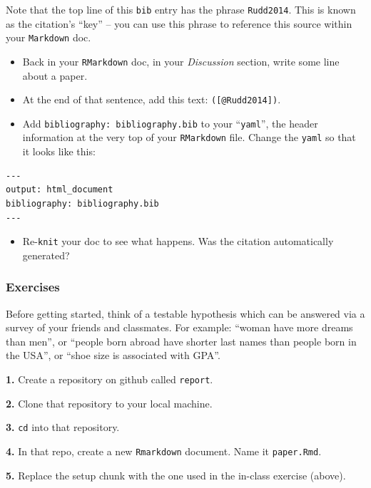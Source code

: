 \documentclass[
]{book}
\providecommand{\tightlist}{%
  \setlength{\itemsep}{0pt}\setlength{\parskip}{0pt}}
\begin{document}
Note that the top line of this \texttt{bib} entry has the phrase \texttt{Rudd2014}. This is known as the citation's ``key'' -- you can use this phrase to reference this source within your \texttt{Markdown} doc.

\begin{itemize}
\item
  Back in your \texttt{RMarkdown} doc, in your \emph{Discussion} section, write some line about a paper.
\item
  At the end of that sentence, add this text: \texttt{({[}@Rudd2014{]})}.
\item
  Add \texttt{bibliography:\ bibliography.bib} to your ``\texttt{yaml}'', the header information at the very top of your \texttt{RMarkdown} file. Change the \texttt{yaml} so that it looks like this:
\end{itemize}

\begin{verbatim}
---
output: html_document
bibliography: bibliography.bib
---
\end{verbatim}

\begin{itemize}
\tightlist
\item
  Re-\texttt{knit} your doc to see what happens. Was the citation automatically generated?
\end{itemize}

\hypertarget{exercises-8}{%
\subsubsection*{Exercises}\label{exercises-8}}

Before getting started, think of a testable hypothesis which can be answered via a survey of your friends and classmates. For example: ``woman have more dreams than men'', or ``people born abroad have shorter last names than people born in the USA'', or ``shoe size is associated with GPA''.

\textbf{1.} Create a repository on github called \texttt{report}.

\textbf{2.} Clone that repository to your local machine.

\textbf{3.} \texttt{cd} into that repository.

\textbf{4.} In that repo, create a new \texttt{Rmarkdown} document. Name it \texttt{paper.Rmd}.

\textbf{5.} Replace the setup chunk with the one used in the in-class exercise (above).
\end{document}
